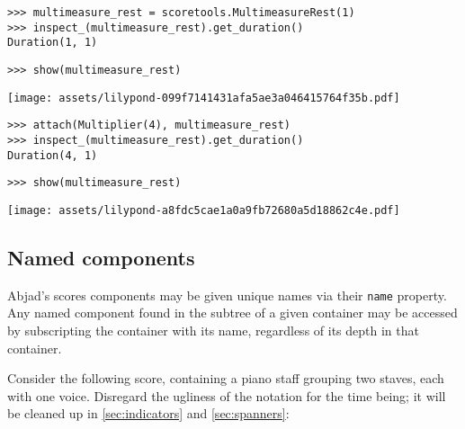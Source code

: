 \begin{abjadbookoutput}
\begin{singlespacing}
\vspace{-0.5\baselineskip}
\begin{lstlisting}
>>> multimeasure_rest = scoretools.MultimeasureRest(1)
>>> inspect_(multimeasure_rest).get_duration()
Duration(1, 1)
\end{lstlisting}
\begin{lstlisting}
>>> show(multimeasure_rest)
\end{lstlisting}
\noindent\texttt{[image: assets/lilypond-099f7141431afa5ae3a046415764f35b.pdf]}
\begin{lstlisting}
>>> attach(Multiplier(4), multimeasure_rest)
>>> inspect_(multimeasure_rest).get_duration()
Duration(4, 1)
\end{lstlisting}
\begin{lstlisting}
>>> show(multimeasure_rest)
\end{lstlisting}
\noindent\texttt{[image: assets/lilypond-a8fdc5cae1a0a9fb72680a5d18862c4e.pdf]}
\end{singlespacing}
\end{abjadbookoutput}

\subsection{Named components}
\label{ssec:named-components}

Abjad's scores components may be given unique names via their \texttt{name}
property. Any named component found in the subtree of a given container may be
accessed by subscripting the container with its name, regardless of its depth
in that container.

Consider the following score, containing a piano staff grouping two staves,
each with one voice. Disregard the ugliness of the notation for the time being;
it will be cleaned up in \autoref{sec:indicators} and \autoref{sec:spanners}:

\begin{comment}
<abjad>
voice_1 = Voice(name='Voice 1')
voice_1.append(Measure((3, 4), "d'4.. b'16 af'4"))
voice_1.append(Measure((5, 4), "af'4. g'8 c''8 b'4. b'8 r16 d''16"))
upper_staff = Staff(
    [voice_1],
    name='Upper Staff',
    )
voice_2 = Voice(name='Voice 2')
voice_2.append(Measure((3, 4), "r8 c'8 r8 d8 r8 e8"))
voice_2.append(Measure((5, 4), r"r4 \times 2/3 { g4 fs4 e8 cs8 } r4. fs8"))
lower_staff = Staff(
    [voice_2],
    name='Lower Staff',
    )
staff_group = StaffGroup(
    [upper_staff, lower_staff],
    context_name='PianoStaff',
    name='Both Staves',
    )
score = Score([staff_group])
show(score)
</abjad>
\end{comment}

